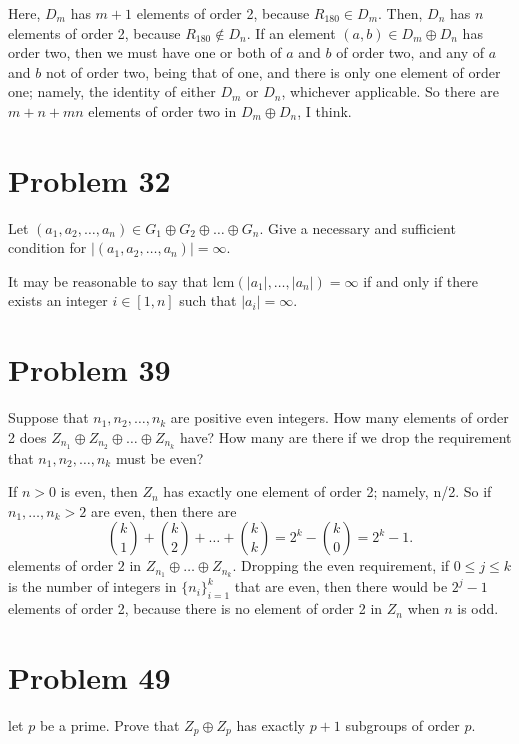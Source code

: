 \documentclass[12pt]{article}
\newcommand{\lcm}{\mbox{lcm}}
\begin{document}
Here, $D_m$ has $m+1$ elements of order 2, because $R_{180}\in D_m$.
Then, $D_n$ has $n$ elements of order 2, because $R_{180}\not\in D_n$.
If an element $(a,b)\in D_m\oplus D_n$ has order two, then we must
have one or both of $a$ and $b$ of order two, and any of $a$ and $b$
not of order two, being that of one, and there is only one element
of order one; namely, the identity of either $D_m$ or $D_n$, whichever applicable.  So there are $m+n+mn$ elements
of order two in $D_m\oplus D_n$, I think.

\section*{Problem 32}

Let $(a_1,a_2,\dots,a_n)\in G_1\oplus G_2\oplus\dots\oplus G_n$.  Give a necessary and
sufficient condition for $|(a_1,a_2,\dots,a_n)|=\infty$.

It may be reasonable to say that $\lcm(|a_1|,\dots,|a_n|)=\infty$
if and only if there exists an integer $i\in [1,n]$ such that $|a_i|=\infty$.

\section*{Problem 39}

Suppose that $n_1,n_2,\dots,n_k$ are positive even integers.  How many elements
of order 2 does $Z_{n_1}\oplus Z_{n_2}\oplus\dots\oplus Z_{n_k}$ have?  How many
are there if we drop the requirement that $n_1,n_2,\dots,n_k$ must be even?

If $n>0$ is even, then $Z_n$ has exactly one element of order 2; namely, n/2.
So if $n_1,\dots,n_k>2$ are even, then there are
\begin{equation*}
\binom{k}{1}+\binom{k}{2}+\dots+\binom{k}{k}=2^k - \binom{k}{0} = 2^k - 1.
\end{equation*}
elements of order $2$ in $Z_{n_1}\oplus\dots\oplus Z_{n_k}$.
Dropping the even requirement, if $0\leq j\leq k$ is the number
of integers in $\{n_i\}_{i=1}^k$ that are even, then there
would be $2^j-1$ elements of order 2, because there is no
element of order 2 in $Z_n$ when $n$ is odd.

\section*{Problem 49}

let $p$ be a prime.  Prove that $Z_p\oplus Z_p$ has exactly $p+1$ subgroups
of order $p$.
\end{document}
